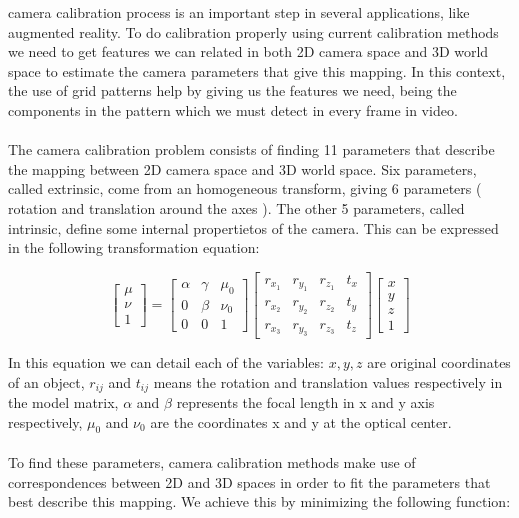 \documentclass[journal]{IEEEtran}
\begin{document}
 camera calibration process is an important step in several applications, like augmented reality. To do calibration properly using current calibration methods we need to get features we can related in both 2D camera space and 3D world space to estimate the camera parameters that give this mapping. In this context, the use of grid patterns help by giving us the features we need, being the components in the pattern which we must detect in every frame in video.
\\
\\
The camera calibration problem consists of finding 11 parameters that describe the mapping between 2D camera space and 3D world space. Six parameters, called extrinsic, come from an homogeneous transform, giving 6 parameters ( rotation and translation around the axes ). The other 5 parameters, called intrinsic, define some internal propertietos of the camera. This can be expressed in the following transformation equation:

\begin{equation}
  \begin{bmatrix}
    \mu \\
    \nu \\
      1 
  \end{bmatrix} = 
  \begin{bmatrix}
    \alpha & \gamma & \mu_{0} \\
       0   & \beta  & \nu_{0} \\
       0   &    0   &    1
  \end{bmatrix} 
  \begin{bmatrix}
    r_{x_{1}} & r_{y_{1}} & r_{z_{1}} & t_{x}\\
    r_{x_{2}} & r_{y_{2}} & r_{z_{2}} & t_{y}\\
    r_{x_{3}} & r_{y_{3}} & r_{z_{3}} & t_{z}
  \end{bmatrix} 
  \begin{bmatrix}
    x \\
    y \\
    z \\
    1
  \end{bmatrix}
%
\end{equation}

In this equation we can detail each of the variables: $x,y,z$ are original coordinates of an object, $r_{ij}$ and $t_{ij}$ means the rotation and translation values respectively in the model matrix, $\alpha$ and $\beta$ represents the focal length in x and y axis respectively, $\mu_0$ and $\nu_0$ are the coordinates x and y at the optical center.
\\
\\
To find these parameters, camera calibration methods make use of correspondences between 2D and 3D spaces in order to fit the parameters that best describe this mapping. We achieve this by minimizing the following function:
\end{document}
